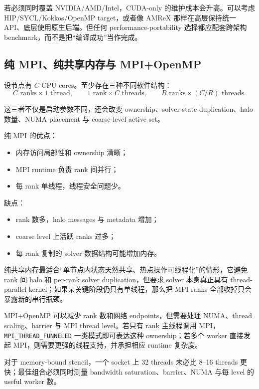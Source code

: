若必须同时覆盖 NVIDIA/AMD/Intel，CUDA-only 的维护成本会升高。可以考虑 HIP/SYCL/Kokkos/OpenMP target，或者像 AMReX 那样在高层保持统一 API、底层使用原生后端\cite{amrexGPUdocs2026}。但任何 performance-portability 选择都应配套跨架构 benchmark，而不是把“编译成功”当作完成。

\subsection{纯 MPI、纯共享内存与 MPI+OpenMP}

设节点有 $C$ CPU cores。至少存在三种不同软件结构：
\begin{equation}
\boxed{
C\text{ ranks}\times1\text{ thread},
\qquad
1\text{ rank}\times C\text{ threads},
\qquad
R\text{ ranks}\times(C/R)\text{ threads}.
}
\end{equation}

这三者不仅是启动参数不同，还会改变 ownership、solver state duplication、halo 数量、NUMA placement 与 coarse-level active set。

纯 MPI 的优点：
\begin{itemize}
\item 内存访问局部性和 ownership 清晰；
\item MPI runtime 负责 rank 间并行；
\item 每 rank 单线程，线程安全问题少。
\end{itemize}
缺点：
\begin{itemize}
\item rank 数多，halo messages 与 metadata 增加；
\item coarse level 上活跃 ranks 过多；
\item 每 rank 复制的 solver 数据结构可能增加内存。
\end{itemize}

纯共享内存最适合“单节点内状态天然共享、热点操作可线程化”的情形，它避免 rank 间 halo 和 per-rank solver duplication，但要求 solver 本身真正具有 thread-parallel kernel；如果某关键阶段仍只有单线程，那么把 MPI ranks 全部收掉只会暴露新的串行瓶颈。

MPI+OpenMP 可以减少 rank 数和网络 endpoints，但需要处理 NUMA、thread scaling、barrier 与 MPI thread level。若只有 rank 主线程调用 MPI，\texttt{MPI\_THREAD\_FUNNELED} 一类模式即可表达这种 ownership；若多个 worker 直接发起 MPI，则需要更强的线程支持，并承担相应 runtime 复杂度。

对于 memory-bound stencil，一个 socket 上 32 threads 未必比 8--16 threads 更快；最佳组合必须同时测量 bandwidth saturation、barrier、NUMA 与每 level 的 useful worker 数。

